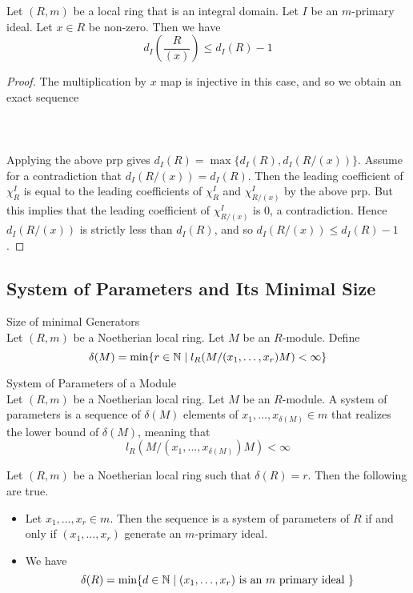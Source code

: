 \documentclass[a4paper]{article}
\begin{document}
\begin{crl}{}{} Let $(R,m)$ be a local ring that is an integral domain. Let $I$ be an $m$-primary ideal. Let $x\in R$ be non-zero. Then we have $$d_I\left(\frac{R}{(x)}\right)\leq d_I(R)-1$$ 
\begin{proof}
The multiplication by $x$ map is injective in this case, and so we obtain an exact sequence \\~\\
\\~\\
Applying the above prp gives $d_I(R)=\max\{d_I(R),d_I(R/(x))\}$. Assume for a contradiction that $d_I(R/(x))=d_I(R)$. Then the leading coefficient of $\chi_R^I$ is equal to the leading coefficients of $\chi_R^I$ and $\chi_{R/(x)}^I$ by the above prp. But this implies that the leading coefficient of $\chi_{R/(x)}^I$ is $0$, a contradiction. Hence $d_I(R/(x))$ is strictly less than $d_I(R)$, and so $d_I(R/(x))\leq d_I(R)-1$. 
\end{proof}
\end{crl}

\subsection{System of Parameters and Its Minimal Size}
\begin{defn}{Size of minimal Generators}{}\\
Let $(R,m)$ be a Noetherian local ring. Let $M$ be an $R$-module. Define $$\delta(M)=\min\{r\in\mathbb{N}\;|\;l_R(M/(x_1,\dots,x_r)M)<\infty\}$$
\end{defn}

\begin{defn}{System of Parameters of a Module}{}\\
Let $(R,m)$ be a Noetherian local ring. Let $M$ be an $R$-module. A system of parameters is a sequence of $\delta(M)$ elements of $x_1,\dots,x_{\delta(M)}\in m$ that realizes the lower bound of $\delta(M)$, meaning that $$l_R(M/(x_1,\dots,x_{\delta(M)})M)<\infty$$
\end{defn}

\begin{lmm}{}{} Let $(R,m)$ be a Noetherian local ring such that $\delta(R)=r$. Then the following are true. 
\begin{itemize}
\item Let $x_1,\dots,x_r\in m$. Then the sequence is a system of parameters of $R$ if and only if $(x_1,\dots,x_r)$ generate an $m$-primary ideal. 
\item We have $$\delta(R)=\min\{d\in\mathbb{N}\;|\;(x_1,\dots,x_r)\text{ is an }m\text{ primary ideal }\}$$
\end{itemize}
\end{lmm}
\end{document}
